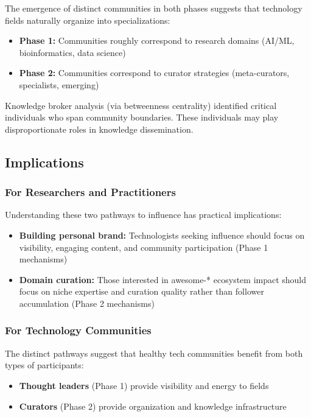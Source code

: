 \documentclass[11pt]{article}
\begin{document}
The emergence of distinct communities in both phases suggests that technology fields naturally organize into specializations:

\begin{itemize}
    \item \textbf{Phase 1:} Communities roughly correspond to research domains (AI/ML, bioinformatics, data science)
    \item \textbf{Phase 2:} Communities correspond to curator strategies (meta-curators, specialists, emerging)
\end{itemize}

Knowledge broker analysis (via betweenness centrality) identified critical individuals who span community boundaries. These individuals may play disproportionate roles in knowledge dissemination.

\subsection{Implications}

\subsubsection{For Researchers and Practitioners}

Understanding these two pathways to influence has practical implications:

\begin{itemize}
    \item \textbf{Building personal brand:} Technologists seeking influence should focus on visibility, engaging content, and community participation (Phase 1 mechanisms)
    \item \textbf{Domain curation:} Those interested in awesome-* ecosystem impact should focus on niche expertise and curation quality rather than follower accumulation (Phase 2 mechanisms)
\end{itemize}

\subsubsection{For Technology Communities}

The distinct pathways suggest that healthy tech communities benefit from both types of participants:
\begin{itemize}
    \item \textbf{Thought leaders} (Phase 1) provide visibility and energy to fields
    \item \textbf{Curators} (Phase 2) provide organization and knowledge infrastructure
\end{itemize}
\end{document}
